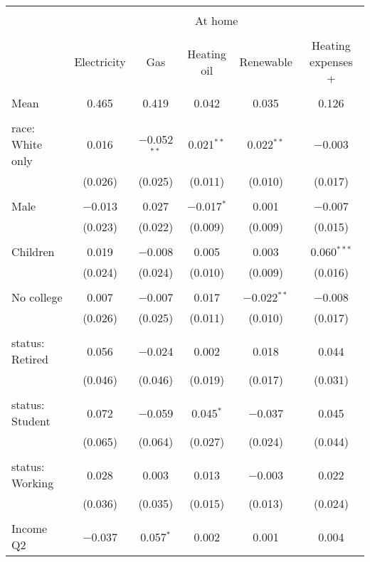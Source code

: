 
\begin{tabular}{@{\extracolsep{5pt}}lccccc} 
\\[-1.8ex]\hline 
\hline \\[-1.8ex] 
 & \multicolumn{5}{c}{At home} \\ 
\cline{2-6} 
\\[-1.8ex] & Electricity & Gas & Heating oil & Renewable & Heating expenses \textdollar 200+ \\ 
\hline \\[-1.8ex] 
 Mean & 0.465 & 0.419 & 0.042 & 0.035 & 0.126  \\ \hline \\[-1.8ex] race: White only & 0.016 & $-$0.052$^{**}$ & 0.021$^{**}$ & 0.022$^{**}$ & $-$0.003 \\ 
  & (0.026) & (0.025) & (0.011) & (0.010) & (0.017) \\ 
  & & & & & \\ 
 Male & $-$0.013 & 0.027 & $-$0.017$^{*}$ & 0.001 & $-$0.007 \\ 
  & (0.023) & (0.022) & (0.009) & (0.009) & (0.015) \\ 
  & & & & & \\ 
 Children & 0.019 & $-$0.008 & 0.005 & 0.003 & 0.060$^{***}$ \\ 
  & (0.024) & (0.024) & (0.010) & (0.009) & (0.016) \\ 
  & & & & & \\ 
 No college & 0.007 & $-$0.007 & 0.017 & $-$0.022$^{**}$ & $-$0.008 \\ 
  & (0.026) & (0.025) & (0.011) & (0.010) & (0.017) \\ 
  & & & & & \\ 
 status: Retired & 0.056 & $-$0.024 & 0.002 & 0.018 & 0.044 \\ 
  & (0.046) & (0.046) & (0.019) & (0.017) & (0.031) \\ 
  & & & & & \\ 
 status: Student & 0.072 & $-$0.059 & 0.045$^{*}$ & $-$0.037 & 0.045 \\ 
  & (0.065) & (0.064) & (0.027) & (0.024) & (0.044) \\ 
  & & & & & \\ 
 status: Working & 0.028 & 0.003 & 0.013 & $-$0.003 & 0.022 \\ 
  & (0.036) & (0.035) & (0.015) & (0.013) & (0.024) \\ 
  & & & & & \\ 
 Income Q2 & $-$0.037 & 0.057$^{*}$ & 0.002 & 0.001 & 0.004 \\ 

\end{tabular}
